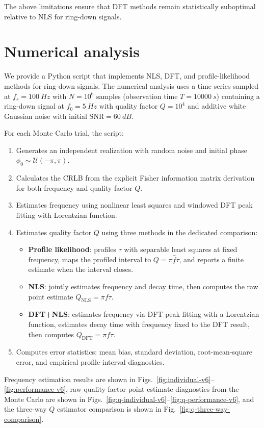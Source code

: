 \documentclass[11pt]{article}
\begin{document}
The above limitations ensure that DFT methods remain statistically suboptimal relative to NLS for ring-down signals.

\section{Numerical analysis}

We provide a Python script that implements NLS, DFT, and profile-likelihood methods for ring-down signals. The numerical analysis uses a time series sampled at $f_s = \SI{100}{Hz}$ with $N = 10^6$ samples (observation time $T = \SI{10000}{s}$) containing a ring-down signal at $f_0 = \SI{5}{Hz}$ with quality factor $Q = 10^4$ and additive white Gaussian noise with initial $\mathrm{SNR} = \SI{60}{dB}$.

For each Monte Carlo trial, the script:
\begin{enumerate}
\item Generates an independent realization with random noise and initial phase $\phi_0 \sim \mathcal{U}(-\pi, \pi)$.
\item Calculates the CRLB from the explicit Fisher information matrix derivation for both frequency and quality factor $Q$.
\item Estimates frequency using nonlinear least squares and windowed DFT peak fitting with Lorentzian function.
\item Estimates quality factor $Q$ using three methods in the dedicated comparison:
  \begin{itemize}
  \item \textbf{Profile likelihood}: profiles $\tau$ with separable least squares at fixed frequency, maps the profiled interval to $Q = \pi \hat f\tau$, and reports a finite estimate when the interval closes.
  \item \textbf{NLS}: jointly estimates frequency and decay time, then computes the raw point estimate $Q_{\mathrm{NLS}} = \pi f \tau$.
  \item \textbf{DFT+NLS}: estimates frequency via DFT peak fitting with a Lorentzian function, estimates decay time with frequency fixed to the DFT result, then computes $Q_{\mathrm{DFT}} = \pi f \tau$.
  \end{itemize}
\item Computes error statistics: mean bias, standard deviation, root-mean-square error, and empirical profile-interval diagnostics.
\end{enumerate}

Frequency estimation results are shown in Figs.~\ref{fig:individual-v6}--\ref{fig:performance-v6}, raw quality-factor point-estimate diagnostics from the Monte Carlo are shown in Figs.~\ref{fig:q-individual-v6}--\ref{fig:q-performance-v6}, and the three-way $Q$ estimator comparison is shown in Fig.~\ref{fig:q-three-way-comparison}.
\end{document}
